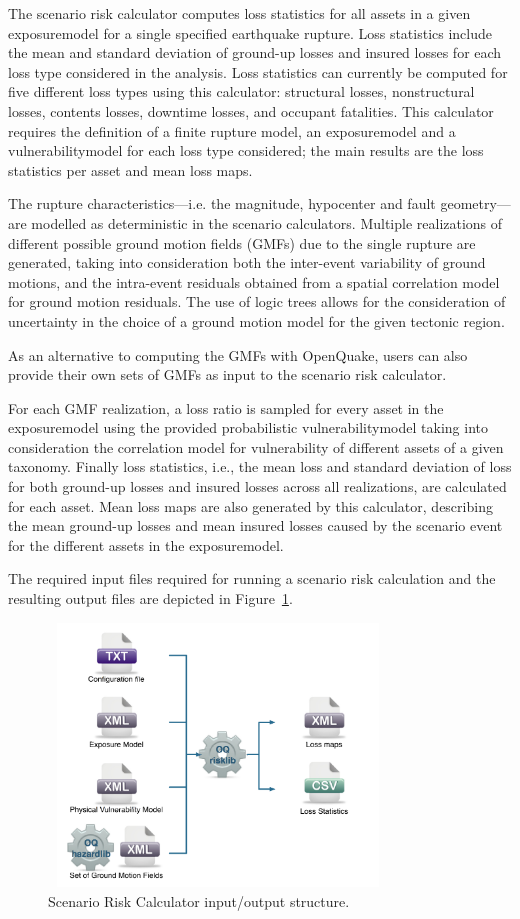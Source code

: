 The scenario risk calculator computes loss statistics for all \glspl{asset} in
a given \gls{exposuremodel} for a single specified earthquake rupture. Loss
statistics include the mean and standard deviation of ground-up losses and
insured losses for each loss type considered in the analysis. Loss statistics
can currently be computed for five different loss types using this calculator:
structural losses, nonstructural losses, contents losses, downtime losses, and
occupant fatalities. This calculator requires the definition of a finite
rupture model, an \gls{exposuremodel} and a \gls{vulnerabilitymodel} for each
loss type considered; the main results are the loss statistics per \gls{asset}
and mean loss maps.

The rupture characteristics---i.e. the magnitude, hypocenter and fault
geometry---are modelled as deterministic in the scenario calculators. Multiple
realizations of different possible ground motion fields (GMFs) due to the
single rupture are generated, taking into consideration both the inter-event
variability of ground motions, and the intra-event residuals obtained from a
spatial correlation model for ground motion residuals. The use of logic trees
allows for the consideration of uncertainty in the choice of a ground motion
model for the given tectonic region.

As an alternative to computing the GMFs with OpenQuake, users can also provide
their own sets of GMFs as input to the scenario risk calculator.

For each GMF realization, a loss ratio is sampled for every asset in the
\gls{exposuremodel} using the provided probabilistic \gls{vulnerabilitymodel}
taking into consideration the correlation model for vulnerability of different
assets of a given taxonomy. Finally loss statistics, i.e., the mean loss and
standard deviation of loss for both ground-up losses and insured losses across
all realizations, are calculated for each asset. Mean loss maps are also
generated by this calculator, describing the mean ground-up losses and mean
insured losses caused by the scenario event for the different assets in the
\gls{exposuremodel}.

The required input files required for running a scenario risk calculation and
the resulting output files are depicted in Figure~\ref{fig:io-structure-scenario-risk}.

\begin{figure}[ht]
\centering
\includegraphics[width=9cm,height=7cm]{figures/risk/io-structure-scenario-risk.pdf}
\caption{Scenario Risk Calculator input/output structure.}
\label{fig:io-structure-scenario-risk}
\end{figure}